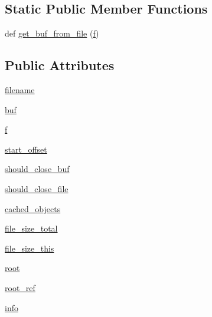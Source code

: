 \subsection*{Static Public Member Functions}
\begin{DoxyCompactItemize}
\item 
def \hyperlink{classPIL_1_1PdfParser_1_1PdfParser_a7d36fb36a41b3269bba5abf7566a1f84}{get\+\_\+buf\+\_\+from\+\_\+file} (\hyperlink{classPIL_1_1PdfParser_1_1PdfParser_af9b8a3dc7186c5b6d8e55ec12b11a2f2}{f})
\end{DoxyCompactItemize}
\subsection*{Public Attributes}
\begin{DoxyCompactItemize}
\item 
\hyperlink{classPIL_1_1PdfParser_1_1PdfParser_ab9551413e0825fd42feb1d4db625678c}{filename}
\item 
\hyperlink{classPIL_1_1PdfParser_1_1PdfParser_a9415ec570537b797c62a91e93f08a099}{buf}
\item 
\hyperlink{classPIL_1_1PdfParser_1_1PdfParser_af9b8a3dc7186c5b6d8e55ec12b11a2f2}{f}
\item 
\hyperlink{classPIL_1_1PdfParser_1_1PdfParser_a063b01fc065f9fcefe733d286add5ddb}{start\+\_\+offset}
\item 
\hyperlink{classPIL_1_1PdfParser_1_1PdfParser_a78749bacd94dd90c178111705a64d817}{should\+\_\+close\+\_\+buf}
\item 
\hyperlink{classPIL_1_1PdfParser_1_1PdfParser_ad0a59874f8c180a8877e88f545b3c69f}{should\+\_\+close\+\_\+file}
\item 
\hyperlink{classPIL_1_1PdfParser_1_1PdfParser_ad8d3c61b04c9904f214ea85a7fab24c9}{cached\+\_\+objects}
\item 
\hyperlink{classPIL_1_1PdfParser_1_1PdfParser_a9f2f9303d1268ea9a2dd008acc371071}{file\+\_\+size\+\_\+total}
\item 
\hyperlink{classPIL_1_1PdfParser_1_1PdfParser_a761cf72c4a6381fd03982fe7ea63db69}{file\+\_\+size\+\_\+this}
\item 
\hyperlink{classPIL_1_1PdfParser_1_1PdfParser_a0bc69fde85b1d43c6d222c85db0d92db}{root}
\item 
\hyperlink{classPIL_1_1PdfParser_1_1PdfParser_a0cbb34ddaef5e493bd24f4cd759f96b3}{root\+\_\+ref}
\item 
\hyperlink{classPIL_1_1PdfParser_1_1PdfParser_a1e80960bd14edc70445ccbc2fcc47546}{info}
\item 

\end{DoxyCompactItemize}

